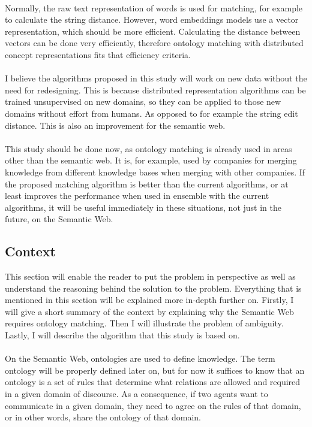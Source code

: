 \documentclass{article}
\begin{document}
 \paragraph{}
 Normally, the raw text representation of words is used for matching, for example to calculate the string distance. However, word embeddings models use a vector representation, which should be more efficient.
 Calculating the distance between vectors can be done very efficiently, therefore ontology matching with distributed concept representations fits that efficiency criteria. 
 \paragraph{}
 I believe the algorithms proposed in this study will work on new data without the need for redesigning. This is because distributed representation algorithms can be trained unsupervised on new domains, so they can be applied to those new domains without effort from humans. As opposed to for example the string edit distance. This is also an improvement for the semantic web.
 \paragraph{}
 This study should be done now, as ontology matching is already used in areas other than the semantic web. It is, for example, used by companies for merging knowledge from different knowledge bases when merging with other companies. If the proposed matching algorithm is better than the current algorithms, or at least improves the performance when used in ensemble with the current algorithms, it will be useful immediately in these situations, not just in the future, on the Semantic Web.

 \subsection{Context}
 This section will enable the reader to put the problem in perspective as well as understand the reasoning behind the solution to the problem. Everything that is mentioned in this section will be explained more in-depth further on.
 Firstly, I will give a short summary of the context by explaining why the Semantic Web requires ontology matching. Then I will illustrate the problem of ambiguity. Lastly, I will describe the algorithm that this study is based on.
 \paragraph{}
 On the Semantic Web, ontologies are used to define knowledge\cite{fensel2001ontologies}.
 The term ontology will be properly defined later on, but for now it suffices to know that an ontology is a set of rules that determine what relations are allowed and required in a given domain of discourse. As a consequence, if two agents want to communicate in a given domain, they need to agree on the rules of that domain, or in other words, share the ontology of that domain.
\end{document}

